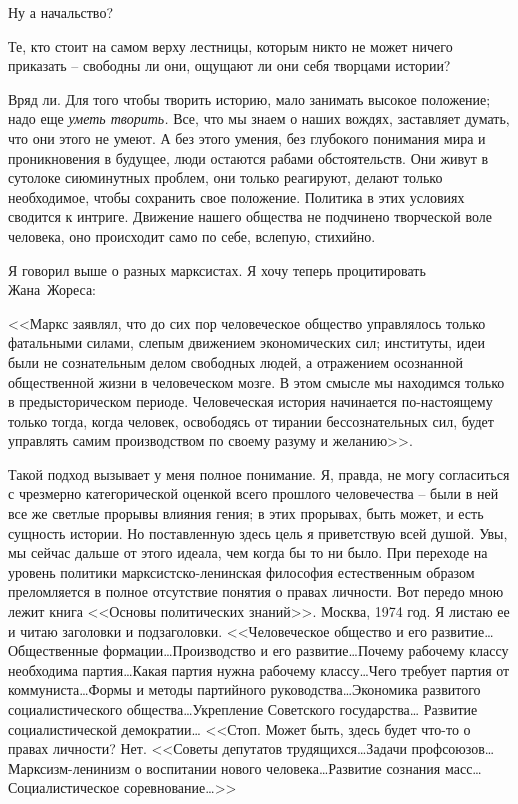 \documentclass{book}
\begin{document}
Ну а начальство?

Те, кто стоит на самом верху лестницы, которым никто не может ничего приказать -- свободны ли они, ощущают ли они себя творцами 
истории?

Вряд ли. Для того чтобы творить историю, мало занимать высокое положение; надо еще \textit{уметь творить.}  Все, что мы знаем о 
наших вождях, заставляет думать, что они этого не умеют. А без этого умения, без глубокого понимания мира и проник­новения в 
будущее, люди остаются рабами обстоятельств. Они живут в сутолоке сиюминутных проблем, они только реаги­руют, делают только 
необходимое, чтобы сохранить свое поло­жение. Политика в этих условиях сводится к интриге. Движе­ние нашего общества не подчинено 
творческой воле человека, оно происходит само по себе, вслепую, стихийно.

Я говорил выше о разных марксистах. Я хочу теперь проци­тировать Жана~Жореса:

<<Маркс заявлял, что до сих пор человеческое общество управлялось только фатальными силами, слепым движением экономических сил; 
институты, идеи были не сознательным делом свободных людей, а отражением осознанной обществен­ной жизни в человеческом мозге. В 
этом смысле мы находим­ся только в предысторическом периоде. Человеческая история начинается по-настоящему только тогда, когда 
человек, освободясь от тирании бессознательных сил, будет управлять самим производством по своему разуму и желанию>>.%

Такой подход вызывает у меня полное понимание. Я, правда, не могу согласиться с чрезмерно категорической оценкой всего прошлого 
человечества -- были в ней все же светлые прорывы влияния гения; в этих прорывах, быть может, и есть сущность истории. Но 
поставленную здесь цель я приветствую всей душой. Увы, мы сейчас дальше от этого идеала, чем когда бы то ни было.
При переходе на уровень политики марксистско-ленинская философия естественным образом преломляется в полное отсутствие понятия о 
правах личности. Вот передо мною лежит книга <<Основы политических знаний>>. Москва, 1974 год. Я листаю ее и читаю заголовки и 
подзаголовки. <<Человеческое общество и его развитие\ldots Общественные формации\ldots Производство и его развитие\ldots Почему 
рабочему классу необходима партия\ldots Какая партия нужна рабочему классу\ldots Чего требует партия от коммуниста\ldots Формы и 
методы партийного руко­водства\ldots Экономика развитого социалистического общества\ldots Укрепление Советского государства\ldots 
Развитие социалистиче­ской демократии… <<Стоп. Может быть, здесь будет что-то о правах личности? Нет. <<Советы депутатов 
трудящихся\ldots Задачи профсоюзов\ldots Марксизм-ленинизм о воспитании нового человека\ldots Развитие сознания масс\ldots 
Социалистическое соревнование\ldots>>
\end{document}

